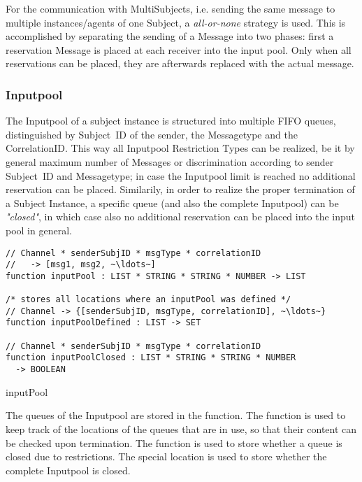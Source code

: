For the communication with MultiSubjects, i.e. sending the same message to multiple instances/agents of one Subject, a \textit{all-or-none} strategy is used. This is accomplished by separating the sending of a Message into two phases: first a reservation Message is placed at each receiver into the input pool. Only when all reservations can be placed, they are afterwards replaced with the actual message.



\subsubsection{Inputpool}\label{sec:Inputpool}

The Inputpool of a subject instance is structured into multiple FIFO queues, distinguished by Subject~ID of the sender, the Messagetype and the CorrelationID. This way all Inputpool Restriction Types can be realized, be it by general maximum number of Messages or discrimination according to sender Subject~ID and Messagetype; in case the Inputpool limit is reached no additional reservation can be placed. Similarily, in order to realize the proper termination of a Subject Instance, a specific queue (and also the complete Inputpool) can be \textit{"closed"}, in which case also no additional reservation can be placed into the input pool in general.

\begin{listing}[htbp]
\begin{verbatim}
// Channel * senderSubjID * msgType * correlationID
//   -> [msg1, msg2, ~\ldots~]
function inputPool : LIST * STRING * STRING * NUMBER -> LIST

/* stores all locations where an inputPool was defined */
// Channel -> {[senderSubjID, msgType, correlationID], ~\ldots~}
function inputPoolDefined : LIST -> SET

// Channel * senderSubjID * msgType * correlationID
function inputPoolClosed : LIST * STRING * STRING * NUMBER
  -> BOOLEAN
\end{verbatim}
\caption{inputPool}
\label{lst:shortasm:inputPool}
\end{listing}

The queues of the Inputpool are stored in the  function. The function  is used to keep track of the locations of the queues that are in use, so that their content can be checked upon termination. The function  is used to store whether a queue is closed due to restrictions. The special location  is used to store whether the complete Inputpool is closed.


